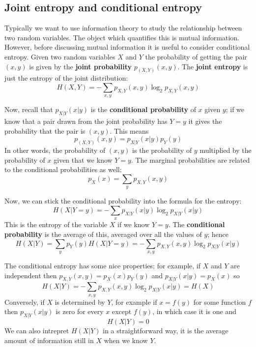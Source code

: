 \documentclass[12pt]{article}
\begin{document}
\subsection*{Joint entropy and conditional entropy}

Typically we want to use information theory to study the relationship
between two random variables. The object which quantifies this is
mutual information. However, before discussing mutual information it
is useful to consider conditional entropy. Given two random variables
$X$ and $Y$ the probability of getting the pair $(x,y)$ is given by
the \textbf{joint probability} $p_{(X,Y)}(x,y)$. The \textbf{joint
  entropy} is just the entropy of the joint distribution:
\begin{equation}
H(X,Y)=-\sum_{x,y}p_{X,Y}(x,y)\log_2{p_{X,Y}(x,y)}
\end{equation}

Now, recall that
$p_{X|Y}(x|y)$ is the \textbf{conditional probability} of $x$ given $y$; if we
know that a pair drawn from the joint probability has $Y=y$ it gives
the probability that the pair is $(x,y)$. This means
\begin{equation}
p_{(X,Y)}(x,y)=p_{X|Y}(x|y)p_Y(y)
\end{equation}
In other words, the probability of $(x,y)$ is the probability of $y$
multiplied by the probability of $x$ given that we know $Y=y$. The
marginal probabilities are related to the conditional probabilities as
well:
\begin{equation}
p_X(x)=\sum_y p_{X,Y}(x,y)
\end{equation}

Now, we can stick the conditional probability into the formula for the entropy:
\begin{equation}
H(X|Y=y)=-\sum_{x} p_{X|Y}(x|y)\log_2{p_{X|Y}(x|y)}
\end{equation}
This is the entropy of the variable $X$ if we know $Y=y$. The \textbf{conditional probability} is the average of this, averaged over all the values of $y$; hence
\begin{equation}
H(X|Y)=\sum_y p_Y(y) H(X|Y=y)=-\sum_{x,y}p_{X,Y}(x,y)\log_2{p_{X|Y}(x|y)}
\end{equation}

The conditional entropy has some nice properties; for example, if $X$
and $Y$ are independent then $p_{X,Y}(x,y)=p_X(x)p_Y(y)$ and
$p_{X|Y}(x|y)=p_X(x)$ so
\begin{equation}
H(X|Y)=-\sum_{x,y}p_{X,Y}(x,y)\log_2{p_{X|Y}(x|y)}=H(X)
\end{equation}
Conversely, if $X$ is determined by $Y$, for example if $x=f(y)$ for
some function $f$ then $p_{X|Y}(x|y)$ is zero for every $x$ except
$f(y)$, in which case it is one and
\begin{equation}
H(X|Y)=0
\end{equation}
We can also intrepret $H(X|Y)$ in a straightforward way, it is the
average amount of information still in $X$ when we know $Y$.
\end{document}
